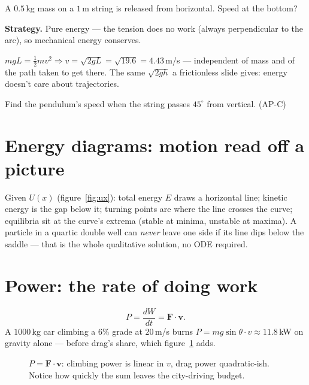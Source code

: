 \begin{example}\label{ex:pendulum}
A $0.5$\,kg mass on a $1$\,m string is released from horizontal. Speed at
the bottom?
\par\smallskip
\textbf{Strategy.} Pure energy --- the tension does no work (always
perpendicular to the arc), so mechanical energy conserves.
\begin{solution}
$mgL=\tfrac12mv^{2} \Rightarrow v=\sqrt{2gL}=\sqrt{19.6}=4.43$\,m/s ---
independent of mass and of the path taken to get there. The same
$\sqrt{2gh}$ a frictionless slide gives: energy doesn't care about
trajectories. \checkmark
\end{solution}
\end{example}

\begin{exercise}[easy]
Find the pendulum's speed when the string passes $45^{\circ}$ from
vertical. (AP-C)
\end{exercise}

\section{Energy diagrams: motion read off a picture}\label{sec:en-diagrams}

Given $U(x)$ (figure~\ref{fig:ux}): total energy $E$ draws a horizontal
line; kinetic energy is the gap below it; turning points are where the
line crosses the curve; equilibria sit at the curve's extrema (stable at
minima, unstable at maxima). A particle in a quartic double well can
\emph{never} leave one side if its line dips below the saddle --- that is
the whole qualitative solution, no ODE required.

\section{Power: the rate of doing work}\label{sec:en-power}

\begin{equation}
  P=\frac{dW}{dt}=\mathbf F\cdot\mathbf v.\label{eq:power}
\end{equation}
A $1000$\,kg car climbing a $6\%$ grade at $20$\,m/s burns
$P=mg\sin\theta\cdot v\approx11.8$\,kW on gravity alone --- before drag's
share, which figure~\ref{fig:power} adds.

\begin{figure}[htbp]\centering

\caption{$P=\mathbf F\cdot\mathbf v$: climbing power is linear in $v$,
drag power quadratic-ish. Notice how quickly the sum leaves the
city-driving budget.}
\label{fig:power}
\end{figure}

